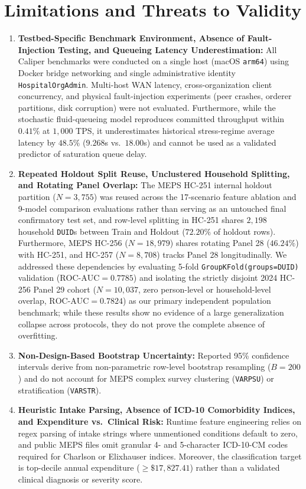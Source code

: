 \documentclass[runningheads]{llncs}
\begin{document}
\section{Limitations and Threats to Validity}
\begin{enumerate}
    \item \textbf{Testbed-Specific Benchmark Environment, Absence of Fault-Injection Testing, and Queueing Latency Underestimation:} All Caliper benchmarks were conducted on a single host (macOS \texttt{arm64}) using Docker bridge networking and single administrative identity \texttt{HospitalOrgAdmin}. Multi-host WAN latency, cross-organization client concurrency, and physical fault-injection experiments (peer crashes, orderer partitions, disk corruption) were not evaluated. Furthermore, while the stochastic fluid-queueing model reproduces committed throughput within $0.41\%$ at $1,000$ TPS, it underestimates historical stress-regime average latency by $48.5\%$ ($9.268$s vs.\ $18.00$s) and cannot be used as a validated predictor of saturation queue delay.
    \item \textbf{Repeated Holdout Split Reuse, Unclustered Household Splitting, and Rotating Panel Overlap:} The MEPS HC-251 internal holdout partition ($N=3,755$) was reused across the 17-scenario feature ablation and 9-model comparison evaluations rather than serving as an untouched final confirmatory test set, and row-level splitting in HC-251 shares $2,198$ household \texttt{DUID}s between Train and Holdout ($72.20\%$ of holdout rows). Furthermore, MEPS HC-256 ($N=18,979$) shares rotating Panel 28 ($46.24\%$) with HC-251, and HC-257 ($N=8,708$) tracks Panel 28 longitudinally. We addressed these dependencies by evaluating 5-fold \texttt{GroupKFold(groups=DUID)} validation ($\text{ROC-AUC} = 0.7785$) and isolating the strictly disjoint 2024 HC-256 Panel 29 cohort ($N=10,037$, zero person-level or household-level overlap, $\text{ROC-AUC} = 0.7824$) as our primary independent population benchmark; while these results show no evidence of a large generalization collapse across protocols, they do not prove the complete absence of overfitting.
    \item \textbf{Non-Design-Based Bootstrap Uncertainty:} Reported 95\% confidence intervals derive from non-parametric row-level bootstrap resampling ($B=200$) and do not account for MEPS complex survey clustering (\texttt{VARPSU}) or stratification (\texttt{VARSTR}).
    \item \textbf{Heuristic Intake Parsing, Absence of ICD-10 Comorbidity Indices, and Expenditure vs.\ Clinical Risk:} Runtime feature engineering relies on regex parsing of intake strings where unmentioned conditions default to zero, and public MEPS files omit granular 4- and 5-character ICD-10-CM codes required for Charlson or Elixhauser indices. Moreover, the classification target is top-decile annual expenditure ($\ge \$17,827.41$) rather than a validated clinical diagnosis or severity score.

\end{enumerate}
\end{document}
